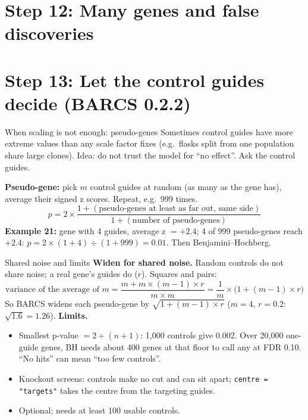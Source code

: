 \documentclass[aspectratio=169,11pt]{beamer}
\begin{document}
\section{Step 12: Many genes and false discoveries}
\section{Step 13: Let the control guides decide (BARCS 0.2.2)}

\begin{frame}{When scaling is not enough: pseudo-genes}
\small
Sometimes control guides have \alert{more extreme values} than any scale
factor fixes (e.g.\ flasks split from one population share large clones).
\alert{Idea: do not trust the model for ``no effect''. Ask the control
guides.}\par\smallskip
\textbf{Pseudo-gene:} pick $m$ control guides at random (as many as the
gene has), average their signed z scores. Repeat, e.g.\ 999 times.
\[
p = 2 \times \frac{1 + (\text{pseudo-genes at least as far out, same side})}{1 + (\text{number of pseudo-genes})}
\]
{\color{barcsgreen!70!black}\textbf{Example 21:}} gene with 4 guides,
average z $= +2.4$; 4 of 999 pseudo-genes reach $+2.4$:
$p = 2 \times (1 + 4) \div (1 + 999) = 0.01$. Then Benjamini--Hochberg.
\end{frame}

\begin{frame}{Shared noise and limits}
\small
\textbf{Widen for shared noise.} Random controls do not share noise; a real
gene's guides do ($r$). Squares and pairs:
\[
\text{variance of the average of } m = \frac{m + m \times (m-1) \times r}{m \times m}
 = \frac{1}{m} \times \bigl(1 + (m-1) \times r\bigr)
\]
So BARCS widens each pseudo-gene by $\sqrt{1 + (m-1) \times r}$
($m = 4$, $r = 0.2$: $\sqrt{1.6} = 1.26$).
\smallskip
\textbf{Limits.}
\begin{itemize}\footnotesize
\item Smallest p-value $= 2 \div (n + 1)$: 1{,}000 controls give 0.002.
  Over 20{,}000 one-guide genes, BH needs about 400 genes at that floor to
  call any at FDR 0.10. ``No hits'' can mean ``too few controls''.
\item Knockout screens: controls make no cut and can sit apart;
  \texttt{centre = "targets"} takes the centre from the targeting guides.
\item Optional; needs at least 100 usable controls.
\end{itemize}
\end{frame}
\end{document}
